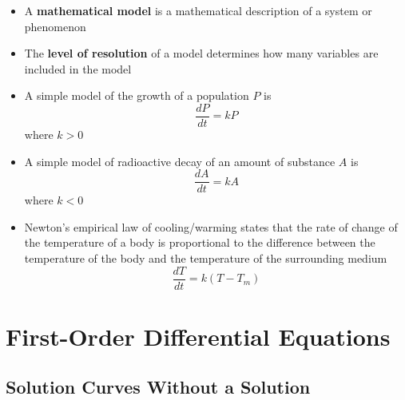 \documentclass{article}
\begin{document}
\begin{itemize}
  \item A \textbf{mathematical model} is a mathematical description of a system or phenomenon

  \item The \textbf{level of resolution} of a model determines how many variables are included in the model

  \item A simple model of the growth of a population $P$ is \[\frac{dP}{dt} = k P\] where $k > 0$

  \item A simple model of radioactive decay of an amount of substance $A$ is \[\frac{dA}{dt} = k A\] where $k < 0$

  \item Newton's empirical law of cooling/warming states that the rate of change of the temperature of a body is proportional to the difference between the temperature of the body and the temperature of the surrounding medium \[\frac{dT}{dt} = k (T - T_m)\]
\end{itemize}

\section{First-Order Differential Equations}

\subsection{Solution Curves Without a Solution}
\end{document}
